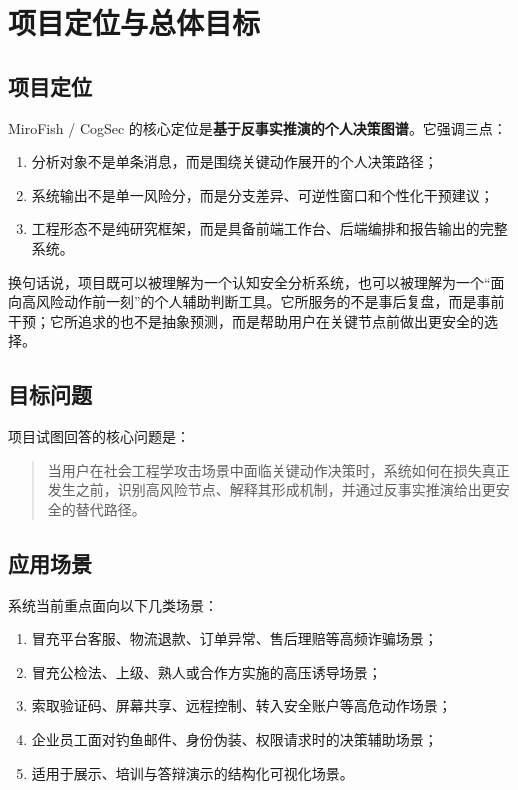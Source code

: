 \documentclass[12pt,a4paper]{ctexart}
\newcommand{\ProjectName}{MiroFish / CogSec}
\newcommand{\CorePosition}{\textbf{基于反事实推演的个人决策图谱}}
\begin{document}
\section{项目定位与总体目标}

\subsection{项目定位}

\ProjectName{} 的核心定位是\CorePosition{}。它强调三点：
\begin{enumerate}[leftmargin=2em]
  \item 分析对象不是单条消息，而是围绕关键动作展开的个人决策路径；
  \item 系统输出不是单一风险分，而是分支差异、可逆性窗口和个性化干预建议；
  \item 工程形态不是纯研究框架，而是具备前端工作台、后端编排和报告输出的完整系统。
\end{enumerate}

换句话说，项目既可以被理解为一个认知安全分析系统，也可以被理解为一个“面向高风险动作前一刻”的个人辅助判断工具。它所服务的不是事后复盘，而是事前干预；它所追求的也不是抽象预测，而是帮助用户在关键节点前做出更安全的选择。

\subsection{目标问题}

项目试图回答的核心问题是：
\begin{quote}
当用户在社会工程学攻击场景中面临关键动作决策时，系统如何在损失真正发生之前，识别高风险节点、解释其形成机制，并通过反事实推演给出更安全的替代路径。
\end{quote}

\subsection{应用场景}

系统当前重点面向以下几类场景：
\begin{enumerate}[leftmargin=2em]
  \item 冒充平台客服、物流退款、订单异常、售后理赔等高频诈骗场景；
  \item 冒充公检法、上级、熟人或合作方实施的高压诱导场景；
  \item 索取验证码、屏幕共享、远程控制、转入安全账户等高危动作场景；
  \item 企业员工面对钓鱼邮件、身份伪装、权限请求时的决策辅助场景；
  \item 适用于展示、培训与答辩演示的结构化可视化场景。
\end{enumerate}
\end{document}

